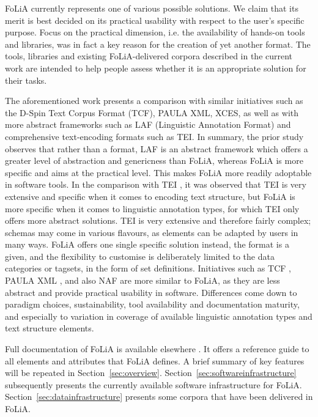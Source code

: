 \documentclass[a4paper,11pt]{article}
\begin{document}
FoLiA currently represents one of various possible solutions.  We claim that its
merit is best decided on its practical usability with respect to the user's
specific purpose. Focus on the practical dimension, i.e. the availability of
hands-on tools and libraries, was in fact a key reason for the creation of yet
another format.  The tools, libraries and existing FoLiA-delivered corpora
described in the current work are intended to help people assess whether it is
an appropriate solution for their tasks.

The aforementioned work \cite{FOLIACLIN2013} presents a comparison with similar
initiatives such as the D-Spin Text Corpus Format (TCF), PAULA XML, XCES, as
well as with more abstract frameworks such as LAF (Linguistic Annotation
Format) and comprehensive text-encoding formats such as TEI. In summary, the
prior study observes that rather than a format, LAF \cite{LAF} is an abstract framework
which offers a greater level of abstraction and genericness than FoLiA,
whereas FoLiA is more specific and aims at the practical level. This makes
FoLiA more readily adoptable in software tools. In the comparison with TEI
\cite{TEI}, it was observed that TEI is very extensive and specific when it
comes to encoding text structure, but FoLiA is more specific when it comes to
linguistic annotation types, for which TEI only offers more abstract solutions.
TEI is very extensive and therefore fairly complex; schemas may come in various
flavours, as elements can be adapted by users in many ways. FoLiA offers one
single specific solution instead, the format is a given, and the flexibility to
customise is deliberately limited to the data categories or tagsets, in the
form of set definitions. Initiatives such as TCF \cite{TCF}, PAULA XML
\cite{PAULA}, and also NAF \cite{NAF} are more similar to FoLiA, as they are
less abstract and provide practical usability in software.  Differences come
down to paradigm choices, sustainability, tool availability and documentation
maturity, and especially to variation in coverage of available linguistic
annotation types and text structure elements.

Full documentation of FoLiA is available elsewhere \cite{FOLIADOC2014}. It
offers a reference guide to all elements and attributes that FoLiA defines.  A
brief summary of key features will be repeated in Section~\ref{sec:overview}.
Section~\ref{sec:softwareinfrastructure} subsequently presents the currently
available software infrastructure for FoLiA.
Section~\ref{sec:datainfrastructure} presents some corpora that have been
delivered in FoLiA.
\end{document}
